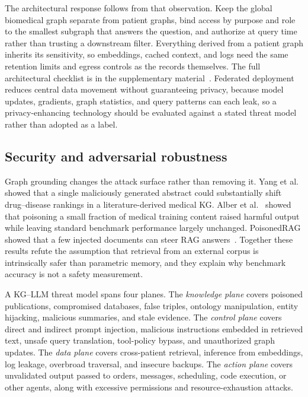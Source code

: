 The architectural response follows from that observation. Keep the global biomedical graph separate from patient graphs, bind access by purpose and role to the smallest subgraph that answers the question, and authorize at query time rather than trusting a downstream filter. Everything derived from a patient graph inherits its sensitivity, so embeddings, cached context, and logs need the same retention limits and egress controls as the records themselves. The full architectural checklist is in the supplementary material~\cite{supplementary}. Federated deployment reduces central data movement without guaranteeing privacy, because model updates, gradients, graph statistics, and query patterns can each leak, so a privacy-enhancing technology should be evaluated against a stated threat model rather than adopted as a label.

\subsection{Security and adversarial robustness}

Graph grounding changes the attack surface rather than removing it. Yang et al.~\cite{yang2024poisoning} showed that a single maliciously generated abstract could substantially shift drug--disease rankings in a literature-derived medical KG. Alber et al.~\cite{alber2025poisoning} showed that poisoning a small fraction of medical training content raised harmful output while leaving standard benchmark performance largely unchanged. PoisonedRAG showed that a few injected documents can steer RAG answers~\cite{zou2025poisonedrag}. Together these results refute the assumption that retrieval from an external corpus is intrinsically safer than parametric memory, and they explain why benchmark accuracy is not a safety measurement.

A KG--LLM threat model spans four planes. The \emph{knowledge plane} covers poisoned publications, compromised databases, false triples, ontology manipulation, entity hijacking, malicious summaries, and stale evidence. The \emph{control plane} covers direct and indirect prompt injection, malicious instructions embedded in retrieved text, unsafe query translation, tool-policy bypass, and unauthorized graph updates. The \emph{data plane} covers cross-patient retrieval, inference from embeddings, log leakage, overbroad traversal, and insecure backups. The \emph{action plane} covers unvalidated output passed to orders, messages, scheduling, code execution, or other agents, along with excessive permissions and resource-exhaustion attacks.

